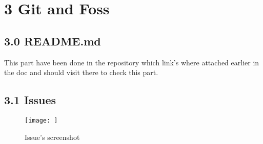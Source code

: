 \documentclass{article}
\begin{document}
\section{\Huge 3 Git and Foss}
\subsection*{\Large 3.0 README.md}
This part have been done in the repository which link's where attached earlier in the doc and should visit there to check this part.
\subsection*{\Large 3.1 Issues}
\begin{figure}[h]
    \centering
    \texttt{[image: ]}
    \caption{Issue's screenshot}
    \label{fig:enter-label}
\end{figure}
\end{document}

